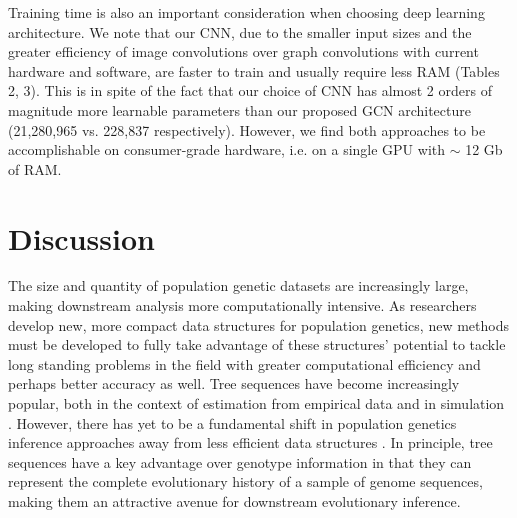 Training time is also an important consideration when choosing deep learning architecture. We note that our CNN, due to the smaller input sizes and the greater efficiency of image convolutions over graph convolutions with current hardware and software, are faster to train and usually require less RAM (Tables 2, 3). This is in spite of the fact that our choice of CNN has almost 2 orders of magnitude more learnable parameters than our proposed GCN architecture (21,280,965 vs. 228,837 respectively). However, we find both approaches to be accomplishable on consumer-grade hardware, i.e. on a single GPU with $\sim$ 12 Gb of RAM. 

\section{Discussion}

The size and quantity of population genetic datasets are increasingly large, making downstream analysis more computationally intensive. As researchers develop new, more compact data structures for population genetics, new methods must be developed to fully take advantage of these structures’ potential to tackle long standing problems in the field with greater computational efficiency and perhaps better accuracy as well. Tree sequences have become increasingly popular, both in the context of estimation from empirical data and in simulation \cite{hallerTreesequenceRecordingSLiM2019,kelleherEfficientPedigreeRecording2018,ralphEfficientlySummarizingRelationships2020}. However, there has yet to be a fundamental shift in population genetics inference approaches away from less efficient data structures \cite{korfmannDeepLearningPopulation2023a}. In principle, tree sequences have a key advantage over genotype information in that they can represent the complete evolutionary history of a sample of genome sequences, making them an attractive avenue for downstream evolutionary inference. 

